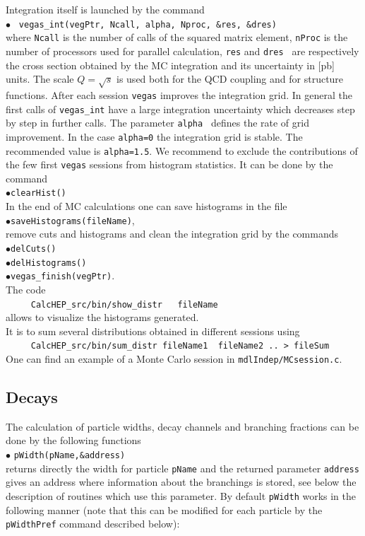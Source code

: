 \documentclass[12pt,a4paper]{article}
\begin{document}
Integration itself is launched by the command \\
$\bullet$ \verb| vegas_int(vegPtr, Ncall, alpha, Nproc, &res, &dres)|\\
where {\tt Ncall} is the number of calls  of the squared matrix element, {\tt nProc} is the  number of processors used for parallel calculation, {\tt res} and {\tt dres } are  respectively the   cross section obtained by the  MC integration  and its uncertainty in [pb] units. The  scale $Q=\sqrt{s}$ is used both for the QCD coupling   and for structure  functions. After each session {\tt vegas} improves the integration grid. In general the  first calls of \verb|vegas_int|  have a  large  integration uncertainty  which decreases  step by step in further calls. 
The parameter {\tt alpha } defines the rate of grid improvement.  In the case {\tt alpha=0} the integration grid is stable. The recommended  value is  {\tt alpha=1.5}.   We recommend to exclude the  contributions of the few  first {\tt vegas}  sessions  from histogram statistics. It can be done by the command\\
$\bullet$\verb|clearHist()|\\

In the end of MC calculations one can save histograms in the file \\
$\bullet$\verb|saveHistograms(fileName)|, \\
remove cuts and histograms and clean the  integration grid by the commands  \\
$\bullet$\verb|delCuts()|\\
$\bullet$\verb|delHistograms()|\\
$\bullet$\verb|vegas_finish(vegPtr)|.\\
The code \\
\verb|     CalcHEP_src/bin/show_distr   fileName |\\
allows to visualize the histograms generated.\\

It is  to sum several distributions obtained in different sessions using\\ 
\verb|     CalcHEP_src/bin/sum_distr fileName1  fileName2 .. > fileSum|\\
One can find an example of a Monte Carlo session in {\tt mdlIndep/MCsession.c}.

\subsection{Decays}
\label{sec:Decays}
The calculation of particle widths, decay channels  and branching fractions
can be done by the following functions\\[2mm]
%
\noindent
$\bullet$ \verb|pWidth(pName,&address)|\\
returns directly the width for  particle {\tt pName} and the returned  parameter \verb|address| 
gives  an address where information about the branchings is stored, see below the description of routines which use this parameter. 
By default {\tt pWidth} works in the following manner (note that this can be modified  for each particle by the {\tt pWidthPref} command described below):
\end{document}
